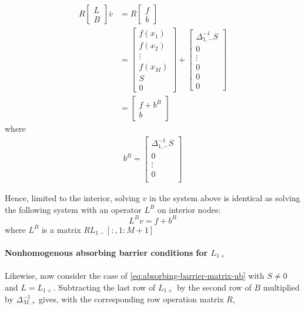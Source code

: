 \documentclass[11pt]{article}
\theoremstyle{definition}
\begin{document}
\begin{align}
R\begin{bmatrix}
 L \\
 B
\end{bmatrix} 
\overline{v}
&= 
R\begin{bmatrix}
f \\
b
\end{bmatrix} \\
&= \begin{bmatrix}
f(x_1) \\
f(x_2) \\
\vdots \\
f(x_M) \\
S \\
0
\end{bmatrix} +
\begin{bmatrix}
\Delta_{1,-}^{-1}S \\
0  \\
\vdots \\ 
0 \\
0 \\
0
\end{bmatrix} \\
&= \begin{bmatrix}
f + b^B \\
b
\end{bmatrix}
\end{align}
where 
\begin{align}
b^B = 
\begin{bmatrix}
\Delta_{1,-}^{-1}S \\
0  \\
\vdots \\ 
0 \\
\end{bmatrix}
\end{align}

Hence, limited to the interior, solving $v$ in the system above is identical as solving the following system with an operator $L^B$ on interior nodes:
\begin{equation}
L^Bv= f + b^B
\end{equation}
where $L^B$ is a matrix $RL_{1-}[:,1:M+1]$

\paragraph{Nonhomogenous absorbing barrier conditions for $L_{1+}$} Likewise, now consider the case of \cref{eq:absorbing-barrier-matrix-ub} with $S\neq 0$ and $L = L_{1+}$. Subtracting the last row of $L_{1+}$ by the second row of $B$ multiplied by $\Delta_{M,+}^{-1}$ gives, with the corresponding row operation matrix $R$, 
\end{document}

